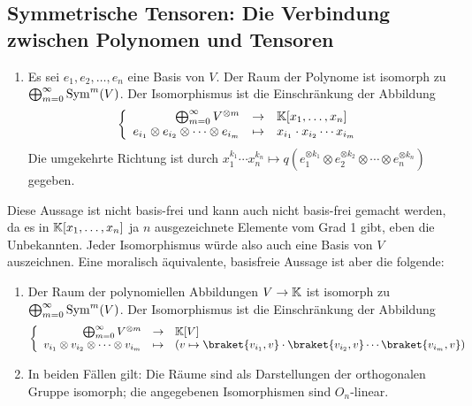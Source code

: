 \subsection{Symmetrische Tensoren: Die Verbindung zwischen Polynomen und Tensoren}
\begin{theorem}
\begin{enumerate}
\item Es sei $e_1, e_2, \ldots, e_n$ eine Basis von $V$. Der Raum der Polynome ist isomorph zu $\bigoplus_{m=0}^\infty \operatorname{Sym}^m(V)$. Der Isomorphismus ist die Einschränkung der Abbildung
\[\left\lbrace\begin{array}{rcl}
\bigoplus_{m=0}^\infty V^{\otimes m} &\to& \mathbb{K}[x_1,\ldots,x_n] \\
e_{i_1} \otimes e_{i_2} \otimes \cdots \otimes e_{i_m} &\mapsto& x_{i_1}\cdot x_{i_2} \cdots x_{i_m}
\end{array}\right.\]
Die umgekehrte Richtung ist durch $x_1^{k_1} \cdots x_n^{k_n} \mapsto q(e_1^{\otimes k_1} \otimes e_2^{\otimes k_2} \otimes \cdots \otimes e_n^{\otimes k_n})$ gegeben.
\end{enumerate}
\smallbreak
Diese Aussage ist nicht basis-frei und kann auch nicht basis-frei gemacht werden, da es in $\mathbb{K}[x_1, \ldots, x_n]$ ja $n$ ausgezeichnete Elemente vom Grad 1 gibt, eben die Unbekannten. Jeder Isomorphismus würde also auch eine Basis von $V$ auszeichnen.
\smallbreak
Eine moralisch äquivalente, basisfreie Aussage ist aber die folgende:
\begin{enumerate}[resume]
\item Der Raum der polynomiellen Abbildungen $V\to\mathbb{K}$ ist isomorph zu $\bigoplus_{m=0}^\infty \operatorname{Sym}^m(V)$. Der Isomorphismus ist die Einschränkung der Abbildung
\[\left\lbrace\begin{array}{rcl}
\bigoplus_{m=0}^\infty V^{\otimes m} &\to& \IK[V] \\
v_{i_1} \otimes v_{i_2} \otimes \cdots \otimes v_{i_m} &\mapsto& (v\mapsto \braket{v_{i_1},v} \cdot \braket{v_{i_2},v} \cdots \braket{v_{i_m},v})
\end{array}\right. \]
\item In beiden Fällen gilt: Die Räume sind als Darstellungen der orthogonalen Gruppe isomorph; die angegebenen Isomorphismen sind $O_n$-linear.
\end{enumerate}
\end{theorem}
